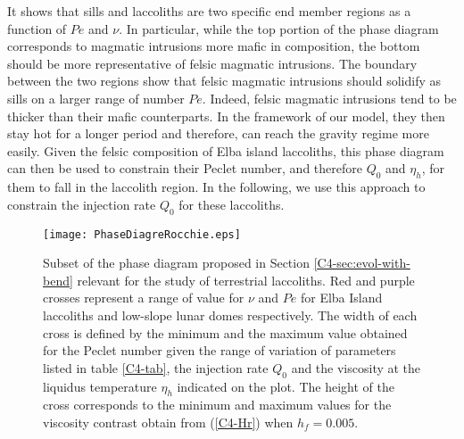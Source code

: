It shows that sills and laccoliths are two specific end member regions
as a function of $Pe$ and  $\nu$. In particular, while the top portion
of the phase diagram corresponds  to magmatic intrusions more mafic in
composition,  the  bottom  should  be more  representative  of  felsic
magmatic intrusions.  The  boundary between the two  regions show that
felsic magmatic intrusions should solidify  as sills on a larger range
of number $Pe$. Indeed, felsic  magmatic intrusions tend to be thicker
than their  mafic counterparts.  In  the framework of our  model, they
then stay hot for a longer period and therefore, can reach the gravity
regime  more easily.   Given  the felsic  composition  of Elba  island
laccoliths, this  phase diagram  can then be  used to  constrain their
Peclet number, and  therefore $Q_0$ and $\eta_h$, for them  to fall in
the  laccolith region.   In the  following,  we use  this approach  to
constrain the injection rate $Q_0$ for these laccoliths.
\begin{figure}[h!]
  \begin{center}
    \graphicspath{ {/Users/thorey/Documents/These/Projet/Refroidissement/Skin_Model/Figure/Figure_Heating/} }
    \texttt{[image: PhaseDiagreRocchie.eps]}
    \caption{Subset  of   the  phase   diagram  proposed   in  Section
      \ref{C4-sec:evol-with-bend}   relevant   for    the   study   of
      terrestrial laccoliths. Red and purple crosses represent a range
      of  value for  $\nu$ and  $Pe$  for Elba  Island laccoliths  and
      low-slope lunar domes  respectively. The width of  each cross is
      defined by  the minimum and  the maximum value obtained  for the
      Peclet number given the range  of variation of parameters listed
      in  table  \ref{C4-tab},  the   injection  rate  $Q_0$  and  the
      viscosity at the liquidus  temperature $\eta_h$ indicated on the
      plot. The  height of  the cross corresponds  to the  minimum and
      maximum   values  for   the  viscosity   contrast  obtain   from
      (\ref{C4-Hr}) when $h_f=0.005$.}
    \label{C4-PhaseDiag}
  \end{center}
\end{figure}

